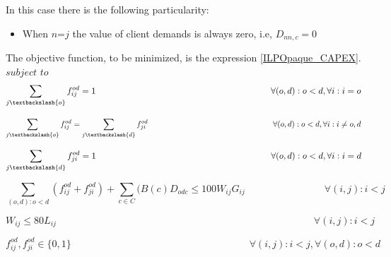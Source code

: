 \vspace{11pt}
In this case there is the following particularity:

\begin{itemize}
  \item When $n$=$j$ the value of client demands is always zero, i.e, $D_{nn,c}=0$
\end{itemize}


\vspace{17pt}
The objective function, to be minimized, is the expression \ref{ILPOpaque_CAPEX}.\\


$subject$ $to$
\begin{equation}
\sum_{j\textbackslash \{o\}} f_{ij}^{od} = 1  \qquad \qquad \qquad \qquad \qquad \qquad \qquad \qquad \qquad \qquad
\forall(o,d) : o < d, \forall i: i = o
\label{ILPOpaque1_Surv}
\end{equation}

\begin{equation}
\sum_{j\textbackslash \{o\}} f_{ij}^{od} = \sum_{j\textbackslash \{d\}} f_{ji}^{od}   \qquad \qquad \qquad \qquad \qquad \qquad \qquad \qquad
\forall(o,d) : o < d, \forall i: i \neq o,d
\label{ILPOpaque2_Surv}
\end{equation}

\begin{equation}
\sum_{j\textbackslash \{d\}} f_{ji}^{od} = 1  \qquad \qquad \qquad \qquad \qquad \qquad \qquad \qquad \qquad \qquad
\forall(o,d) : o < d, \forall i: i = d
\label{ILPOpaque3_Surv}
\end{equation}

\begin{equation}
\sum_{(o,d):o<d} \left(f_{ij}^{od} + f_{ji}^{od}\right) + \sum_{c\in C} (B\left(c\right) D_{odc}\leq100 W_{ij} G_{ij} \qquad \qquad \qquad \qquad
\forall(i,j) : i < j
\label{ILPOpaque4_Surv}
\end{equation}

\begin{equation}
W_{ij} \leq 80 L_{ij} \qquad  \qquad \qquad \qquad \qquad \qquad \qquad \qquad \qquad \qquad \qquad \qquad \qquad \forall(i,j) : i < j
\label{ILPOpaque5_Surv}
\end{equation}

\begin{equation}
f_{ij}^{od} , f_{ji}^{od} \in \{0,1\}   \qquad \qquad \qquad \qquad \qquad \qquad \qquad \qquad \qquad
\forall(i,j) : i < j, \forall(o,d) : o < d
\label{ILPOpaque6_Surv}
\end{equation}

